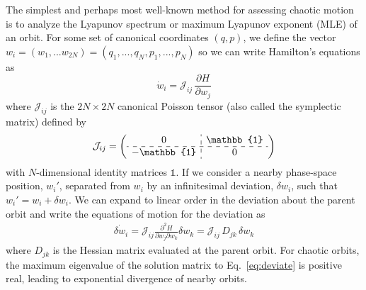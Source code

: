 \documentclass[letterpaper,12pt,preprint]{aastex}
\newcommand{\ident}{\mathbb{1}}
\begin{document}
The simplest and perhaps most well-known method for assessing chaotic motion is to analyze the Lyapunov spectrum or maximum Lyapunov exponent (MLE) of an orbit. For some set of canonical coordinates $(q,p)$, we define the vector $w_i = (w_1,...w_{2N}) = (q_1,...,q_N,p_1,...,p_N)$ so we can write Hamilton's equations as 
\begin{equation}
	\dot{w}_i = \mathcal{J}_{ij}\,\frac{\partial H}{\partial w_j} \label{eq:ham}
\end{equation}
where $\mathcal{J}_{ij}$ is the $2N \times 2N$ canonical Poisson tensor (also called the symplectic matrix) defined by
\begin{equation}
	\mathcal{J}_{ij} = \left( \begin{array}{c:c} 0 & \ident \\ \hdashline -\ident & 0 \end{array} \right)
\end{equation}
with $N$-dimensional identity matrices $\ident$. If we consider a nearby phase-space position, $w_i'$, separated from $w_i$ by an infinitesimal deviation, $\delta w_i$, such that $w_i' = w_i + \delta w_i$. We can expand to linear order in the deviation about the parent orbit and write the equations of motion for the deviation as 
\begin{align}
	\dot{\delta w_i} = \mathcal{J}_{ij} \frac{\partial^2 H}{\partial w_j \partial w_k} \delta w_k =  \mathcal{J}_{ij}\, D_{jk} \, \delta w_k \label{eq:deviate}
\end{align}
where $D_{jk}$ is the Hessian matrix evaluated at the parent orbit. For chaotic orbits, the maximum eigenvalue of the solution matrix to Eq.~\ref{eq:deviate} is positive real, leading to exponential divergence of nearby orbits. 
\end{document}
